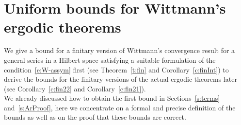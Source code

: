 \section{Uniform bounds for Wittmann's ergodic theorems}\label{s:Main}

We give a bound for a finitary version of Wittmann's convergence result for
a general series in a Hilbert space satisfying a suitable formulation
of the condition~\eqref{e:W-assym} first 
(see Theorem~\ref{t:fin} and Corollary~\ref{c:finInt}) to derive the bounds
for the finitary versions of the actual ergodic theorems later
(see Corollary~\ref{c:fin22} and Corollary~\ref{c:fin21}).\\
We already discussed how to obtain the first bound in Sections~\ref{s:terms} and~\ref{s:ArProof},
here we concentrate on a formal and precise definition of the bounds as well as on the proof
that these bounds are correct.
